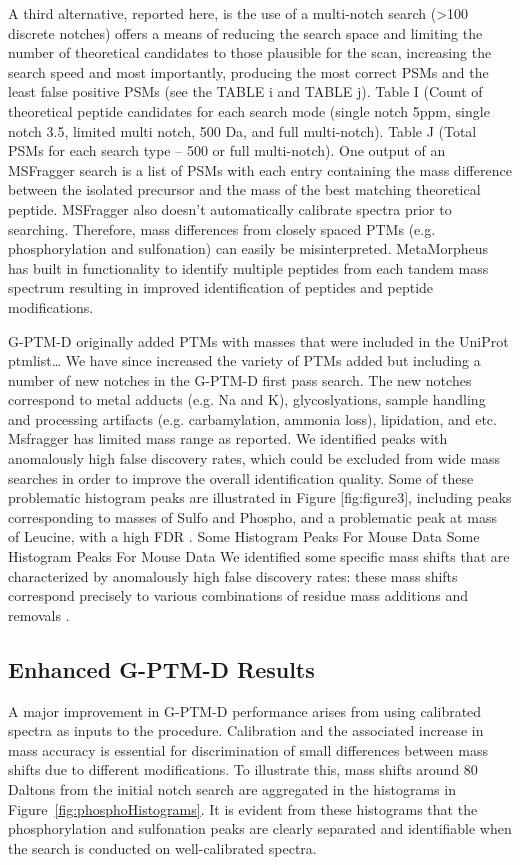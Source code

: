 \documentclass[journal=jprobs,manuscript=article]{achemso}
\begin{document}
A third alternative, reported here, is the use of a multi-notch search (>100 discrete notches) offers a means of reducing the search space and limiting the number of theoretical candidates to those plausible for the scan, increasing the search speed and most importantly, producing the most correct PSMs and the least false positive PSMs (see the TABLE i and TABLE j).
	Table I (Count of theoretical peptide candidates for each search mode (single notch 5ppm, single notch 3.5, limited multi notch, 500 Da, and full multi-notch).
	Table J (Total PSMs for each search type – 500 or full multi-notch). 
One output of an MSFragger search is a list of PSMs with each entry containing the mass difference between the isolated precursor and the mass of the best matching theoretical peptide. MSFragger also doesn’t automatically calibrate spectra prior to searching. Therefore, mass differences from closely spaced PTMs (e.g. phosphorylation and sulfonation) can easily be misinterpreted. MetaMorpheus has built in functionality to identify multiple peptides from each tandem mass spectrum resulting in improved identification of peptides and peptide modifications.


G-PTM-D originally added PTMs with masses that were included in the UniProt ptmlist… We have since increased the variety of PTMs added but including a number of new notches in the G-PTM-D first pass search. The new notches correspond to metal adducts (e.g. Na and K), glycoslyations, sample handling and processing artifacts (e.g. carbamylation, ammonia loss), lipidation, and etc. 
Msfragger has limited mass range as reported.
We identified peaks with anomalously high false discovery rates, which could be excluded from wide mass searches in order to improve the overall identification quality. Some of these problematic histogram peaks are illustrated in Figure [fig:figure3], including peaks corresponding to masses of Sulfo and Phospho, and a problematic peak at mass of Leucine, with a high FDR .
Some Histogram Peaks For Mouse Data
Some Histogram Peaks For Mouse Data
We identified some specific mass shifts that are characterized by anomalously high false discovery rates: these mass shifts correspond precisely to various combinations of residue mass additions and removals .

\subsection{Enhanced G-PTM-D Results}

A major improvement in G-PTM-D performance arises from using calibrated spectra as inputs to the procedure. 
Calibration and the associated increase in mass accuracy is essential for discrimination of small differences between mass shifts due to different modifications.
To illustrate this, mass shifts around 80 Daltons from the initial notch search are aggregated in the histograms in Figure~\ref{fig:phosphoHistograms}.
It is evident from these histograms that the phosphorylation and sulfonation peaks are clearly separated and identifiable when the search is conducted on well-calibrated spectra.
\end{document}
